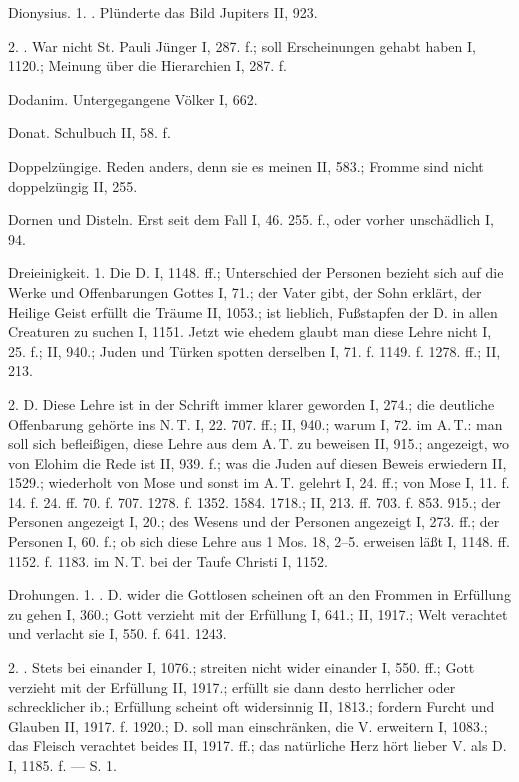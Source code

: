 Dionysius. 1. . Plünderte das Bild Jupiters II, 923.

2. . War nicht St. Pauli Jünger I, 287. f.; soll Erscheinungen gehabt haben I, 1120.; Meinung über die Hierarchien I, 287. f.

Dodanim. Untergegangene Völker I, 662.

Donat. Schulbuch II, 58. f.

Doppelzüngige. Reden anders, denn sie es meinen II, 583.; Fromme sind nicht doppelzüngig II, 255.

Dornen und Disteln. Erst seit dem Fall I, 46. 255. f., oder vorher unschädlich I, 94.

Dreieinigkeit. 1. Die  D. I, 1148. ff.; Unterschied der Personen bezieht sich auf die Werke und Offenbarungen Gottes I, 71.; der Vater gibt, der Sohn erklärt, der Heilige Geist erfüllt die Träume II, 1053.; ist lieblich, Fußstapfen der D. in allen Creaturen zu suchen I, 1151. Jetzt wie ehedem glaubt man diese Lehre nicht I, 25. f.; II, 940.; Juden und Türken spotten derselben I, 71. f. 1149. f. 1278. ff.; II, 213.

2.  D. Diese Lehre ist in der Schrift immer klarer geworden I, 274.; die deutliche Offenbarung gehörte ins N.\,T. I, 22. 707. ff.; II, 940.; warum I, 72.  im A.\,T.: man soll sich befleißigen, diese Lehre aus dem A.\,T. zu beweisen II, 915.;  angezeigt, wo von Elohim die Rede ist II, 939. f.; was die Juden auf diesen Beweis erwiedern II, 1529.; wiederholt von Mose und sonst im A.\,T. gelehrt I, 24. ff.; von Mose I, 11. f. 14. f. 24. ff. 70. f. 707. 1278. f. 1352. 1584. 1718.; II, 213. ff. 703. f. 853. 915.;  der Personen angezeigt I, 20.;  des Wesens und  der Personen angezeigt I, 273. ff.;  der Personen I, 60. f.; ob sich diese Lehre aus 1 Mos. 18, 2–5. erweisen läßt I, 1148. ff. 1152. f. 1183.  im N.\,T. bei der Taufe Christi I, 1152.

Drohungen. 1. . D. wider die Gottlosen scheinen oft an den Frommen in Erfüllung zu gehen I, 360.; Gott verzieht mit der Erfüllung I, 641.; II, 1917.; Welt verachtet und verlacht sie I, 550. f. 641. 1243.

2. . Stets bei einander I, 1076.; streiten nicht wider einander I, 550. ff.; Gott verzieht mit der Erfüllung II, 1917.; erfüllt sie dann desto herrlicher oder schrecklicher ib.; Erfüllung scheint oft widersinnig II, 1813.; fordern Furcht und Glauben II, 1917. f. 1920.; D. soll man einschränken, die V. erweitern I, 1083.; das Fleisch verachtet beides II, 1917. ff.; das natürliche Herz hört lieber V. als D. I, 1185. f. — S.  1.

